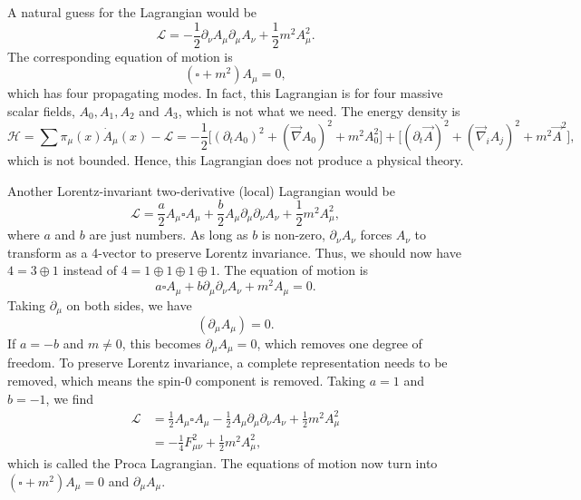 \documentclass[11pt]{article}
\theoremstyle{definition}
\begin{document}
A natural guess for the Lagrangian would be
\begin{equation}
    \mathcal{L} = -\frac{1}{2}\partial_\nu A_\mu\partial_\mu A_\nu + \frac{1}{2}m^2 A_\mu^2.
\end{equation}
The corresponding equation of motion is
\begin{equation}
    (\square+m^2)A_\mu = 0,    
\end{equation}
which has four propagating modes. In fact, this Lagrangian is for four massive scalar fields, $A_0, A_1, A_2$ and $A_3$, which is not what we need. The energy density is 
\begin{equation}
    \mathcal{H} = \sum \pi_\mu(x)\dot{A}_\mu(x) - \mathcal{L} = -\frac{1}{2}\bigg[ (\partial_tA_0)^2 + (\vec{\nabla}A_0)^2 + m^2A_0^2 \bigg] + \bigg[ (\partial_t\vec{A})^2 + (\vec{\nabla}_iA_j)^2 + m^2\vec{A}^2 \bigg],
\end{equation}
which is not bounded. Hence, this Lagrangian does not produce a physical theory.

Another Lorentz-invariant two-derivative (local) Lagrangian would be
\begin{equation}
    \mathcal{L} = \frac{a}{2}A_\mu\square A_\mu + \frac{b}{2}A_\mu \partial_\mu \partial_\nu A_\nu + \frac{1}{2}m^2A_\mu^2,
\end{equation}
where $a$ and $b$ are just numbers. As long as $b$ is non-zero, $\partial_\nu A_\nu$ forces $A_\nu$ to transform as a 4-vector to preserve Lorentz invariance. Thus, we should now have $4= 3\oplus1$ instead of $4= 1\oplus1\oplus1\oplus1$. The equation of motion is
\begin{equation}
    a\square A_\mu + b \partial_\mu \partial_\nu A_\nu + m^2 A_\mu = 0.
\end{equation}
Taking $\partial_\mu$ on both sides, we have
\begin{equation}
    [(a+b)\square + m^2](\partial_\mu A_\mu) = 0. 
\end{equation}
If $a = -b$ and $m \neq 0$, this becomes $\partial_\mu A_\mu = 0$, which removes one degree of freedom. To preserve Lorentz invariance, a complete representation needs to be removed, which means the spin-0 component is removed. Taking $a=1$ and $b=-1$, we find
\begin{equation}
\begin{aligned}
        \mathcal{L} &= \frac{1}{2}A_\mu\square A_\mu - \frac{1}{2}A_\mu \partial_\mu \partial_\nu A_\nu + \frac{1}{2}m^2A_\mu^2\\
        &= -\frac{1}{4}F_{\mu\nu}^2 + \frac{1}{2}m^2A_\mu^2,
\end{aligned}
\end{equation}
which is called the Proca Lagrangian. The equations of motion now turn into $(\square + m^2)A_\mu=0$ and $\partial_\mu A_\mu$.
\end{document}
